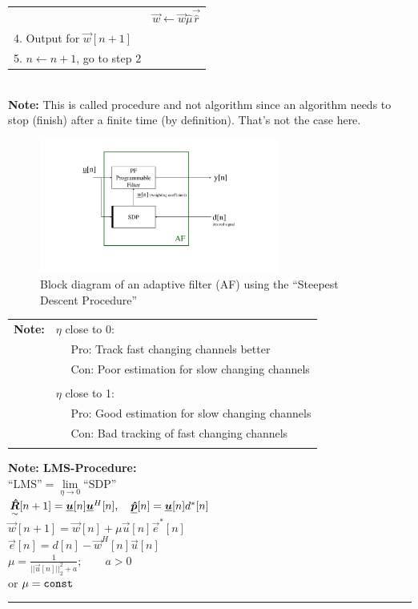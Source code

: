\begin{doublespace}
{\begin{tabular}{ll}
	&$\vec{w}\leftarrow\vec{w}\hat{\mu}\vec{\hat{r}}$\\
	4. Output \vec{w} for $\vec{w}[n+1]$&\\
	5. $n\leftarrow n+1$, go to step 2&\\
\end{tabular}}\\
\textbf{Note:} This is called procedure and not algorithm since an algorithm needs to stop (finish) after a finite time (by definition). That's not the case here.\\
\begin{figure}[H]
	\centering
		\includegraphics[trim =4cm 3cm 4cm 1cm, clip, width=0.70\textwidth]{graphics/adaptive_filter_with_SDP.pdf}
	\caption{Block diagram of an adaptive filter (AF) using the ``Steepest Descent Procedure''}
	\label{fig:adaptive_filter_with_SDP}
\end{figure}

\begin{tabular}{ll}
\textbf{Note:}&$\eta$ close to 0:\\
&$\quad$ Pro: Track fast changing channels better\\
&$\quad$ Con: Poor estimation for slow changing channels\\
&\\
&$\eta$ close to 1:\\
&$\quad$ Pro: Good estimation for slow changing channels\\
&$\quad$ Con: Bad tracking of fast changing channels\\
&\\
\end{tabular}

\textbf{Note: LMS-Procedure:}\\
$\text{``LMS''}=\lim\limits_{\eta\rightarrow 0}\text{``SDP''}$\\
$\underset{\sim}{\boldsymbol {\hat{R}}}[n+1]=\underline{\boldsymbol {u}}[n]\underline{\boldsymbol {u}}^H[n], \quad \underline{\boldsymbol {\hat{p}}}[n]=\underline{\boldsymbol {u}}[n]d^*[n]$\\
$\vec{w}[n+1]=\vec{w}[n]+\mu\vec{u}[n]\vec{e}^*[n]$\\
$\vec{e}[n]=d[n]-\vec{w}^H[n]\vec{u}[n]$\\
$\mu=\frac{1}{||\vec{u}[n]||_2^2+a};\qquad a>0$\\
or $\mu=\texttt{const}$\\
\rule{\textwidth}{0.4pt}


\end{doublespace}
